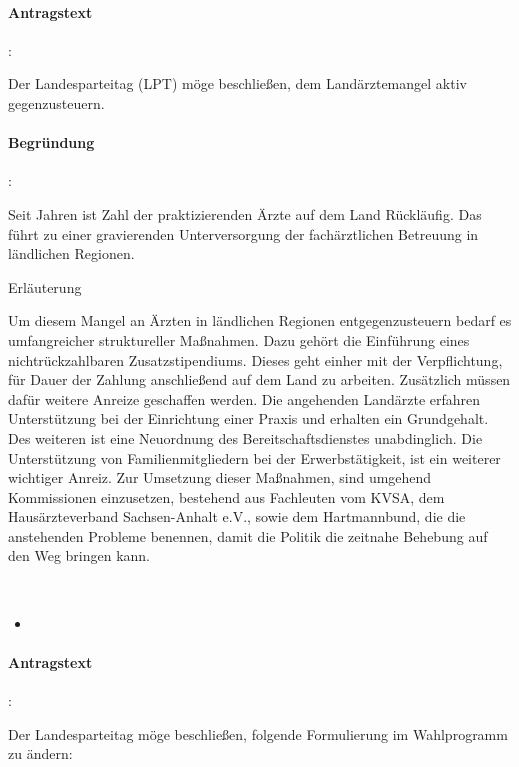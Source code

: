 \paragraph{Antragstext}:

Der Landesparteitag (LPT) möge beschließen, dem Landärztemangel aktiv gegenzusteuern.

\paragraph{Begründung}:

Seit Jahren ist Zahl der praktizierenden Ärzte auf dem Land Rückläufig. Das führt zu einer gravierenden Unterversorgung der fachärztlichen Betreuung in ländlichen Regionen.


Erläuterung

Um diesem Mangel an Ärzten in ländlichen Regionen entgegenzusteuern bedarf es umfangreicher struktureller Maßnahmen. Dazu gehört die Einführung eines nichtrückzahlbaren Zusatzstipendiums. Dieses geht einher mit der Verpflichtung, für Dauer der Zahlung anschließend auf dem Land zu arbeiten. Zusätzlich müssen dafür weitere Anreize geschaffen werden. Die angehenden Landärzte erfahren Unterstützung bei der Einrichtung einer Praxis und erhalten ein Grundgehalt. Des weiteren ist eine Neuordnung des Bereitschaftsdienstes unabdinglich. Die Unterstützung von Familienmitgliedern bei der Erwerbstätigkeit, ist ein weiterer wichtiger Anreiz. Zur Umsetzung dieser Maßnahmen, sind umgehend Kommissionen einzusetzen, bestehend aus Fachleuten vom KVSA, dem Hausärzteverband Sachsen-Anhalt e.V., sowie dem Hartmannbund, die die anstehenden Probleme benennen, damit die Politik die zeitnahe Behebung auf den Weg bringen kann. 


\label{wpa:vergaberegister2}
\\
\begin{itemize}
\item {}
\end{itemize}

\paragraph{Antragstext}:

Der Landesparteitag möge beschließen, folgende Formulierung im Wahlprogramm zu ändern:

